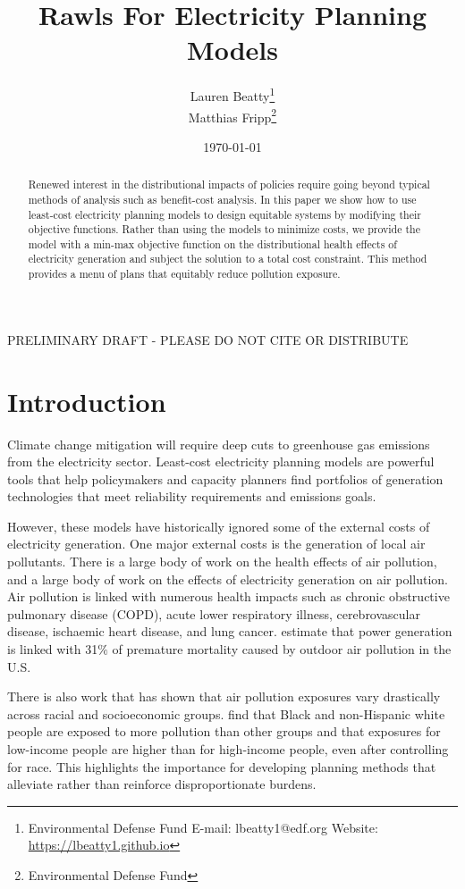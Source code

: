 \documentclass[a4paper]{article}
\title{Rawls For Electricity Planning Models}
\author{Lauren Beatty\thanks{Environmental Defense Fund  \hspace{.5cm} E-mail: lbeatty1@edf.org \hspace{.5cm}Website: \href{https://lbeatty1.github.io}{https://lbeatty1.github.io}}\\
Matthias Fripp\thanks{Environmental Defense Fund}}
\date{\today}
\theoremstyle{definition}
\theoremstyle{plain}
\begin{document}
\maketitle
\begin{center}
    PRELIMINARY DRAFT - PLEASE DO NOT CITE OR DISTRIBUTE
\end{center}

\begin{abstract}
Renewed interest in the distributional impacts of policies require going beyond typical methods of analysis such as benefit-cost analysis.  In this paper we show how to use least-cost electricity planning models to design equitable systems by modifying their objective functions.  Rather than using the models to minimize costs, we provide the model with a min-max objective function on the distributional health effects of electricity generation and subject the solution to a total cost constraint.  This method provides a menu of plans that equitably reduce pollution exposure.
\end{abstract}


\newpage
\section{Introduction}
Climate change mitigation will require deep cuts to greenhouse gas emissions from the electricity sector.  Least-cost electricity planning models are powerful tools that help policymakers and capacity planners find portfolios of generation technologies that meet reliability requirements and emissions goals.  

However, these models have historically ignored some of the external costs of electricity generation.  
 One major external costs is the generation of local air pollutants.  There is a large body of work on the health effects of air pollution, and a large body of work on the effects of electricity generation on air pollution. 
Air pollution is linked with numerous health impacts such as chronic obstructive pulmonary disease (COPD), acute lower respiratory illness, cerebrovascular disease, ischaemic heart disease, and lung cancer. \cite{Lelieveld2015TheScale} estimate that power generation is linked with 31$\%$ of premature mortality caused by outdoor air pollution in the U.S.

There is also work that has shown that air pollution exposures vary drastically across racial and socioeconomic groups.   \cite{Thind2019FineGeography} find that Black and non-Hispanic white people are exposed to more pollution than other groups and that exposures for low-income people are higher than for high-income people, even after controlling for race.  This highlights the importance for developing planning methods that alleviate rather than reinforce disproportionate burdens.
\end{document}
